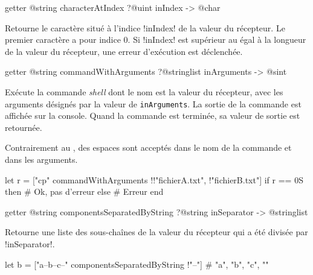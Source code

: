 
\begin{galgas3box}
getter @string characterAtIndex ?@uint inIndex -> @char
\end{galgas3box}

Retourne le caractère situé à l'indice \ggst!inIndex! de la valeur du récepteur. Le premier caractère a pour indice $0$. Si \ggst!inIndex! est supérieur au égal à la longueur de la valeur du récepteur, une erreur d'exécution est déclenchée.












\begin{galgas3box}
getter @string commandWithArguments ?@stringlist inArguments -> @sint
\end{galgas3box}
Exécute la commande \emph{shell} dont le nom est la valeur du récepteur, avec les arguments désignés par la valeur de \texttt{inArguments}. La sortie de la commande est affichée sur la console. Quand la commande est terminée, sa valeur de sortie est retournée.

Contrairement au , des espaces sont acceptés dans le nom de la commande et dans les arguments.

\begin{galgas3}
let r = ["cp" commandWithArguments !{!"fichierA.txt", !"fichierB.txt"}]
if r == 0S then
  # Ok, pas d'erreur
else
  # Erreur
end
\end{galgas3}
















\begin{galgas3box}
getter @string componentsSeparatedByString ?@string inSeparator -> @stringlist
\end{galgas3box}
Retourne une liste des sous-chaînes de la valeur du récepteur qui a été divisée par \ggst!inSeparator!.

\begin{galgas3}
let b = ["a--b--c--" componentsSeparatedByString !"--"]
# "a", "b", "c", ""
\end{galgas3}












